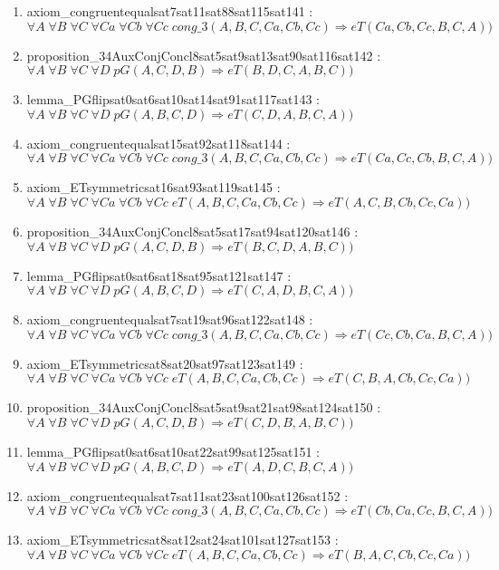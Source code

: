 \documentclass{article}
\begin{document}
\begin{enumerate}
\item axiom\_congruentequalsat7sat11sat88sat115sat141 : $\forall A\;\forall B\;\forall C\;\forall Ca\;\forall Cb\;\forall Cc\;cong\_3(A, B, C, Ca, Cb, Cc) \Rightarrow eT(Ca, Cb, Cc, B, C, A))$
\item proposition\_34AuxConjConcl8sat5sat9sat13sat90sat116sat142 : $\forall A\;\forall B\;\forall C\;\forall D\;pG(A, C, D, B) \Rightarrow eT(B, D, C, A, B, C))$
\item lemma\_PGflipsat0sat6sat10sat14sat91sat117sat143 : $\forall A\;\forall B\;\forall C\;\forall D\;pG(A, B, C, D) \Rightarrow eT(C, D, A, B, C, A))$
\item axiom\_congruentequalsat15sat92sat118sat144 : $\forall A\;\forall B\;\forall C\;\forall Ca\;\forall Cb\;\forall Cc\;cong\_3(A, B, C, Ca, Cb, Cc) \Rightarrow eT(Ca, Cc, Cb, B, C, A))$
\item axiom\_ETsymmetricsat16sat93sat119sat145 : $\forall A\;\forall B\;\forall C\;\forall Ca\;\forall Cb\;\forall Cc\;eT(A, B, C, Ca, Cb, Cc) \Rightarrow eT(A, C, B, Cb, Cc, Ca))$
\item proposition\_34AuxConjConcl8sat5sat17sat94sat120sat146 : $\forall A\;\forall B\;\forall C\;\forall D\;pG(A, C, D, B) \Rightarrow eT(B, C, D, A, B, C))$
\item lemma\_PGflipsat0sat6sat18sat95sat121sat147 : $\forall A\;\forall B\;\forall C\;\forall D\;pG(A, B, C, D) \Rightarrow eT(C, A, D, B, C, A))$
\item axiom\_congruentequalsat7sat19sat96sat122sat148 : $\forall A\;\forall B\;\forall C\;\forall Ca\;\forall Cb\;\forall Cc\;cong\_3(A, B, C, Ca, Cb, Cc) \Rightarrow eT(Cc, Cb, Ca, B, C, A))$
\item axiom\_ETsymmetricsat8sat20sat97sat123sat149 : $\forall A\;\forall B\;\forall C\;\forall Ca\;\forall Cb\;\forall Cc\;eT(A, B, C, Ca, Cb, Cc) \Rightarrow eT(C, B, A, Cb, Cc, Ca))$
\item proposition\_34AuxConjConcl8sat5sat9sat21sat98sat124sat150 : $\forall A\;\forall B\;\forall C\;\forall D\;pG(A, C, D, B) \Rightarrow eT(C, D, B, A, B, C))$
\item lemma\_PGflipsat0sat6sat10sat22sat99sat125sat151 : $\forall A\;\forall B\;\forall C\;\forall D\;pG(A, B, C, D) \Rightarrow eT(A, D, C, B, C, A))$
\item axiom\_congruentequalsat7sat11sat23sat100sat126sat152 : $\forall A\;\forall B\;\forall C\;\forall Ca\;\forall Cb\;\forall Cc\;cong\_3(A, B, C, Ca, Cb, Cc) \Rightarrow eT(Cb, Ca, Cc, B, C, A))$
\item axiom\_ETsymmetricsat8sat12sat24sat101sat127sat153 : $\forall A\;\forall B\;\forall C\;\forall Ca\;\forall Cb\;\forall Cc\;eT(A, B, C, Ca, Cb, Cc) \Rightarrow eT(B, A, C, Cb, Cc, Ca))$

\end{enumerate}
\end{document}
